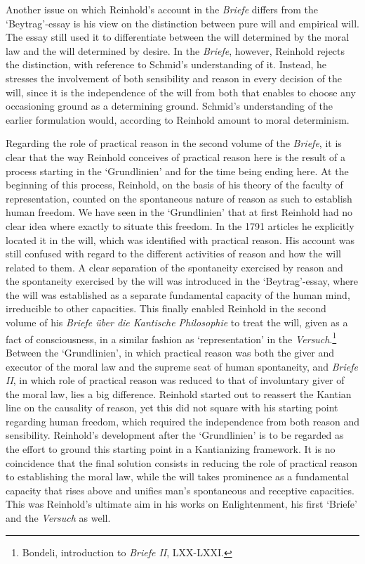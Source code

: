  Another issue on which Reinhold's account in the \textit{Briefe} differs from the `Beytrag'{-}essay is his view on the distinction between pure will and empirical will. The essay still used it to differentiate between the will determined by the moral law and the will determined by desire. In the \textit{Briefe}, however, Reinhold rejects the distinction, with reference to Schmid's understanding of it. Instead, he stresses the involvement of both sensibility and reason in every decision of the will, since it is the independence of the will from both that enables to choose any occasioning ground as a determining ground. Schmid's understanding of the earlier formulation would, according to Reinhold amount to moral determinism. 

 Regarding the role of practical reason in the second volume of the \textit{Briefe}, it is clear that the way Reinhold conceives of practical reason here is the result of a process starting in the `Grundlinien' and for the time being ending here. At the beginning of this process, Reinhold, on the basis of his theory of the faculty of representation, counted on the spontaneous nature of reason as such to establish human freedom. We have seen in the `Grundlinien' that at first Reinhold had no clear idea where exactly to situate this freedom. In the 1791 articles he explicitly located it in the will, which was identified with practical reason. His account was still confused with regard to the different activities of reason and how the will related to them. A clear separation of the spontaneity exercised by reason and the spontaneity exercised by the will was introduced in the `Beytrag'{-}essay, where the will was established as a separate fundamental capacity of the human mind, irreducible to other capacities. This finally enabled Reinhold in the second volume of his \textit{Briefe \"{u}ber die Kantische Philosophie} to treat the will, given as a fact of consciousness, in a similar fashion as `representation' in the \textit{Versuch}.\footnote{ Bondeli, introduction to \textit{Briefe II}, LXX{-}LXXI.} Between the `Grundlinien', in which practical reason was both the giver and executor of the moral law and the supreme seat of human spontaneity, and \textit{Briefe} \textit{II}, in which role of practical reason was reduced to that of involuntary giver of the moral law, lies a big difference. Reinhold started out to reassert the Kantian line on the causality of reason, yet this did not square with his starting point regarding human freedom, which required the independence from both reason and sensibility. Reinhold's development after the `Grundlinien' is to be regarded as the effort to ground this starting point in a Kantianizing framework. It is no coincidence that the final solution consists in reducing the role of practical reason to establishing the moral law, while the will takes prominence as a fundamental capacity that rises above and unifies man's spontaneous and receptive capacities. This was Reinhold's ultimate aim in his works on Enlightenment, his first `Briefe' and the \textit{Versuch }as well. 

